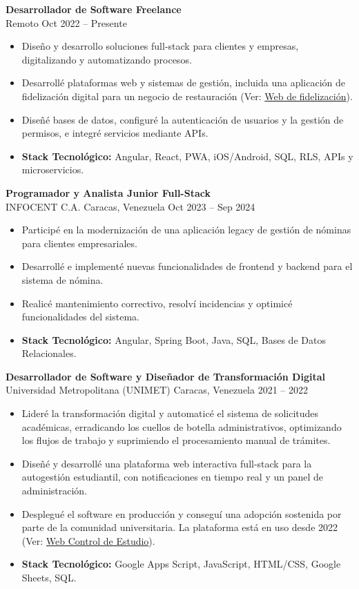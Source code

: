 \documentclass[10pt,a4paper]{article}
\begin{document}
\textbf{\large Desarrollador de Software Freelance}\\
{\color{muted}Remoto \textbar{} Oct 2022 -- Presente}
\begin{itemize}
    \item Diseño y desarrollo soluciones full-stack para clientes y empresas, digitalizando y automatizando procesos.
    \item Desarrollé plataformas web y sistemas de gestión, incluida una aplicación de fidelización digital para un negocio de restauración (Ver: \href{https://avenidakebab.com/}{Web de fidelización}).
    \item Diseñé bases de datos, configuré la autenticación de usuarios y la gestión de permisos, e integré servicios mediante APIs.
    \item \textbf{Stack Tecnológico:} Angular, React, PWA, iOS/Android, SQL, RLS, APIs y microservicios.
\end{itemize}

\textbf{\large Programador y Analista Junior Full-Stack}\\
{\color{muted}INFOCENT C.A. \textbar{} Caracas, Venezuela \textbar{} Oct 2023 -- Sep 2024}
\begin{itemize}
    \item Participé en la modernización de una aplicación legacy de gestión de nóminas para clientes empresariales.
    \item Desarrollé e implementé nuevas funcionalidades de frontend y backend para el sistema de nómina.
    \item Realicé mantenimiento correctivo, resolví incidencias y optimicé funcionalidades del sistema.
    \item \textbf{Stack Tecnológico:} Angular, Spring Boot, Java, SQL, Bases de Datos Relacionales.
\end{itemize}

\textbf{\large Desarrollador de Software y Diseñador de Transformación Digital}\\
{\color{muted}Universidad Metropolitana (UNIMET) \textbar{} Caracas, Venezuela \textbar{} 2021 -- 2022}
\begin{itemize}
    \item Lideré la transformación digital y automaticé el sistema de solicitudes académicas, erradicando los cuellos de botella administrativos, optimizando los flujos de trabajo y suprimiendo el procesamiento manual de trámites.
    \item Diseñé y desarrollé una plataforma web interactiva full-stack para la autogestión estudiantil, con notificaciones en tiempo real y un panel de administración.
    \item Desplegué el software en producción y conseguí una adopción sostenida por parte de la comunidad universitaria. La plataforma está en uso desde 2022 (Ver: \href{https://script.google.com/macros/s/AKfycbw3h26r_mjt0jow79RT9dnPaUKZ81dVUsF8qDeEjp7wsRg-ldqHjlB9L0FJYP_Uc_LXUw/exec}{Web Control de Estudio}).
    \item \textbf{Stack Tecnológico:} Google Apps Script, JavaScript, HTML/CSS, Google Sheets, SQL.
\end{itemize}
\end{document}
